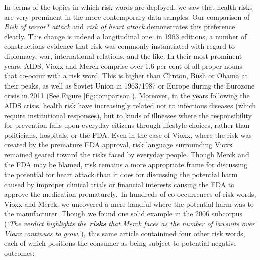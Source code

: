 \noindent In terms of the topics in which risk words are deployed, we saw that health risks are very prominent in the more contemporary data samples. Our comparison of \emph{Risk of terror* attack} and \emph{risk of heart attack} demonstrates this preference clearly. This change is indeed a longitudinal one: in 1963 editions, a number of constructions evidence that risk was commonly instantiated with regard to diplomacy, war, international relations, and the like. In their most prominent years, AIDS, Vioxx and Merck comprise over 1.6 per cent of all proper nouns that co-occur with a risk word. This is higher than Clinton, Bush or Obama at their peaks, as well as Soviet Union in 1963\slash 1987 or Europe during the Eurozone crisis in 2011 (See Figure \ref{fig:comparison}). Moreover, in the years following the AIDS crisis, health risk have increasingly related not to infectious diseases (which require institutional responses), but to kinds of illnesses where the responsibility for prevention falls upon everyday citizens through lifestyle choices, rather than politicians, hospitals, or the FDA. Even in the case of Vioxx, where the risk was created by the premature FDA approval, risk language surrounding Vioxx remained geared toward the risks faced by everyday people. Though Merck and the FDA may be blamed, risk remains a more appropriate frame for discussing the potential for heart attack than it does for discussing the potential harm caused by improper clinical trials or financial interests causing the FDA to approve the medication prematurely.~In hundreds of co-occurrences of risk words, Vioxx and Merck, we uncovered a mere handful where the potential harm was to the manufacturer. Though we found one solid example in the 2006 subcorpus (\emph{`The verdict highlights the \textbf{risks} that Merck faces as the number of lawsuits over Vioxx continues to grow.'}), this same article containined four other risk words, each of which positions the consumer as being subject to potential negative outcomes:


